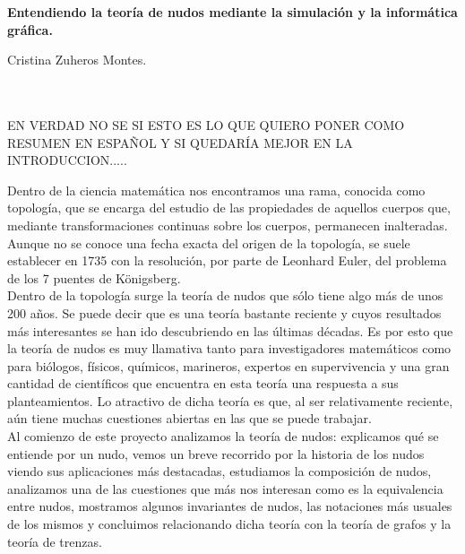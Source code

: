 
\cleardoublepage
\thispagestyle{empty}

\begin{center}
{\large\bfseries Entendiendo la teoría de nudos mediante la simulación y la informática gráfica.}\\
\end{center}
\begin{center}
Cristina Zuheros Montes.\\
\end{center}

\\

\vspace{0.7cm}
\\

EN VERDAD NO SE SI ESTO ES LO QUE QUIERO PONER COMO RESUMEN EN ESPAÑOL Y SI QUEDARÍA MEJOR EN LA INTRODUCCION.....

Dentro de la ciencia matemática nos encontramos una rama, conocida como topología, que se encarga del estudio de las propiedades de aquellos cuerpos que, mediante transformaciones continuas sobre los cuerpos, permanecen inalteradas. Aunque no se conoce una fecha exacta del origen de la topología, se suele establecer en 1735 con la resolución, por parte de Leonhard Euler, del problema de los 7 puentes de Königsberg.\\

Dentro de la topología surge la teoría de nudos que sólo tiene algo más de unos 200 años. Se puede decir que es una teoría bastante reciente y cuyos resultados más interesantes se han ido descubriendo en las últimas décadas. Es por esto que la teoría de nudos es muy llamativa tanto para investigadores matemáticos como para biólogos, físicos, químicos, marineros, expertos en supervivencia y una gran cantidad de científicos que encuentra en esta teoría una respuesta a sus planteamientos. Lo atractivo de dicha teoría es que, al ser relativamente reciente, aún tiene muchas cuestiones abiertas en las que se puede trabajar. \\

Al comienzo de este proyecto analizamos la teoría de nudos: explicamos qué se entiende por un nudo, vemos un breve recorrido por la historia de los nudos viendo sus aplicaciones más destacadas, estudiamos la composición de nudos, analizamos una de las cuestiones que más nos interesan como es la equivalencia entre nudos, mostramos algunos invariantes de nudos, las notaciones más usuales de los mismos y concluimos relacionando dicha teoría con la teoría de grafos y la teoría de trenzas.\\

